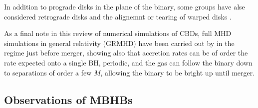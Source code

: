 In addition to prograde disks in the plane of the binary, some groups have alse considered retrograde disks \citep{Nixon+2011, ReodigSesana:2014, BankertShiKrolik:2015, AmaroSeoane:RetroDiscs:2016} and the alignemnt or tearing of warped disks \citep{Nixon+2012, Hayasaki+2013, Nixon+2013, DoganNixonKingPrice:2015}.

As a final note in this review of numerical simulations of CBDs, full MHD
simulations in general relativity (GRMHD) have been carried out by
\cite{FarrisLiuShap:2010:Bondi, FarrisShap:2011, FarrisGold:2012,
Gold:GRMHD_CBD:2014, Gold:GRMHD_CBDII:2014} in the regime just before merger,
showing also that accretion rates can be of order the rate expected onto a
single BH, periodic, and the gas can follow the binary down to separations of
order a few $M$, allowing the binary to be bright up until merger.






\subsection{Observations of MBHBs}

